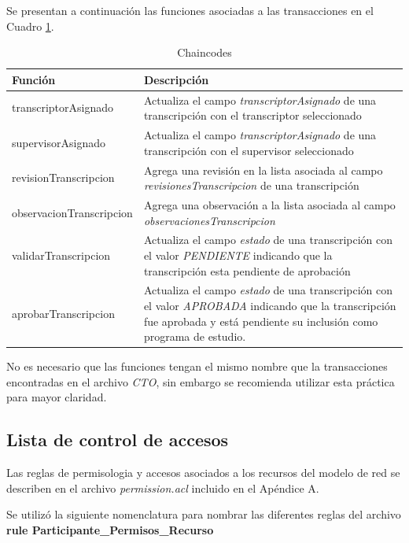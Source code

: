 Se  presentan a continuación las funciones asociadas a las transacciones en el Cuadro \ref{tabla:chaincodes}.

 \begin{table}[H]
     \centering
          \caption{Chaincodes}
     \begin{tabular}{|m{10em}|m{22em}|}
         \hline
         Función & Descripción  \\
         \hline
         transcriptorAsignado & Actualiza el  campo \textit{transcriptorAsignado} de una transcripción con el transcriptor seleccionado \\
         \hline
         supervisorAsignado & Actualiza el campo \textit{transcriptorAsignado} de una transcripción con el supervisor seleccionado\\
         \hline
         revisionTranscripcion & Agrega una revisión en la lista asociada al  campo \textit{revisionesTranscripcion} de una transcripción \\
         \hline
         observacionTranscripcion & Agrega una observación a la lista asociada al campo \textit{observacionesTranscripcion} \\
         \hline
         validarTranscripcion & Actualiza el campo \textit{estado} de una transcripción con el valor \textit {PENDIENTE} indicando que la transcripción esta pendiente de aprobación\\
          \hline
         aprobarTranscripcion & Actualiza el campo \textit{estado} de una transcripción con el valor \textit{APROBADA} indicando que la transcripción fue aprobada y está pendiente su inclusión como programa de estudio.\\
         \hline
     \end{tabular}
     \label{tabla:chaincodes}
 \end{table}

No es necesario que las funciones tengan el mismo nombre que la transacciones encontradas en el archivo \textit{CTO}, sin embargo se recomienda utilizar esta práctica para mayor claridad.


\subsection{Lista de control de accesos}
Las reglas de  permisologia y accesos asociados a los recursos del modelo de red se describen en el archivo \textit{permission.acl} incluido en el Apéndice A.

Se utilizó la siguiente nomenclatura para  nombrar las diferentes reglas del archivo \textbf{rule Participante\_Permisos\_Recurso}

